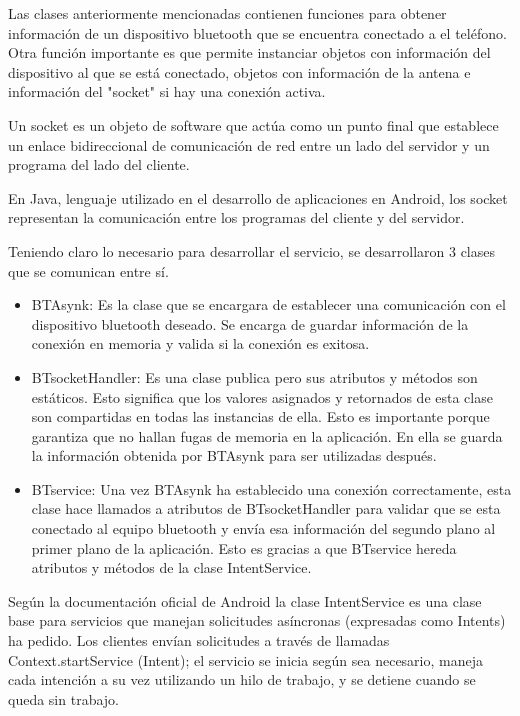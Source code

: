 \par \noindent
Las clases anteriormente mencionadas contienen funciones para obtener información de un dispositivo bluetooth que se encuentra conectado a el teléfono. Otra función importante es que permite instanciar objetos con información del dispositivo al que se está conectado, objetos con información de la antena e información del "socket" si hay una conexión activa. 

\par \noindent
Un socket es un objeto de software que actúa como un punto final que establece un enlace bidireccional de comunicación de red entre un lado del servidor y un programa del lado del cliente.\cite{socket}

\par \noindent
En Java, lenguaje utilizado en el desarrollo de aplicaciones en Android, los socket representan la comunicación entre los programas del cliente y del servidor.\cite{socket}

\par \noindent
Teniendo claro lo necesario para desarrollar el servicio, se desarrollaron 3 clases que se comunican entre sí.

\begin{itemize}
	\item BTAsynk: Es la clase que se encargara de establecer una comunicación con el dispositivo bluetooth deseado. Se encarga de guardar información de la conexión en memoria y valida si la conexión es exitosa.
	
	\item BTsocketHandler: Es una clase publica pero sus atributos y métodos son estáticos. Esto significa que los valores asignados y retornados de esta clase son compartidas en todas las instancias de ella. Esto es importante porque garantiza que no hallan fugas de memoria en la aplicación. En ella se guarda la información obtenida por BTAsynk para ser utilizadas después.
	
	\item BTservice: Una vez BTAsynk ha establecido una conexión correctamente, esta clase hace llamados a atributos de BTsocketHandler para validar que se esta conectado al equipo bluetooth y envía esa información del segundo plano al primer plano de la aplicación. Esto es gracias a que BTservice hereda atributos y métodos de la clase IntentService.
	
\end{itemize}

\par \noindent
Según la documentación oficial de Android la clase IntentService es una clase base para servicios que manejan solicitudes asíncronas (expresadas como Intents) ha pedido. Los clientes envían solicitudes a través de llamadas Context.startService (Intent); el servicio se inicia según sea necesario, maneja cada intención a su vez utilizando un hilo de trabajo, y se detiene cuando se queda sin trabajo.\cite{intentservice}

